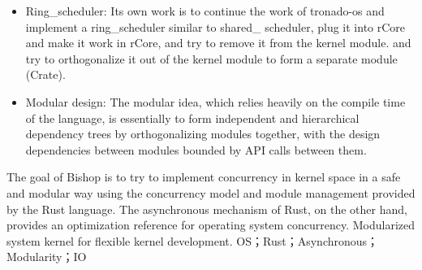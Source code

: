 \begin{itemize}
\item Ring\_scheduler: Its own work is to continue the work of tronado-os and implement a ring\_scheduler similar to shared\_
scheduler, plug it into rCore and make it work in rCore, and try to remove it from the kernel module.
and try to orthogonalize it out of the kernel module to form a separate module (Crate).

\item Modular design: The modular idea, which relies heavily on the compile time of the language, is essentially to form independent and hierarchical dependency trees by orthogonalizing modules together, with the design dependencies between modules bounded by API calls between them.
\end{itemize}


The goal of Bishop is to try to implement concurrency in kernel space in a safe and modular way using the concurrency model and module management provided by the Rust language. The asynchronous mechanism of Rust, on the other hand, provides an optimization reference for operating system concurrency. Modularized system kernel for flexible kernel development.
\keywordsen\quad OS；Rust；Asynchronous；Modularity；IO